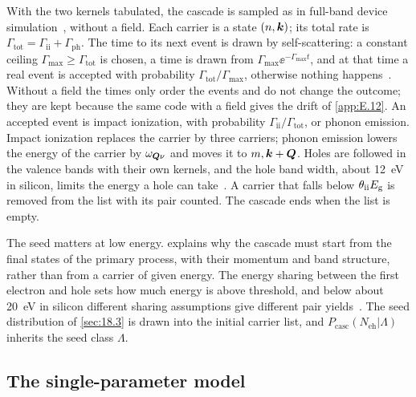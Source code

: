 With the two kernels tabulated, the cascade is sampled as in full-band device simulation~\cite{fischetti1988monte}, without a field. Each carrier is a state $(n, \bm{k})$; its total rate is $\varGamma_{\mathrm{tot}} = \varGamma_{\mathrm{ii}} + \varGamma_{\mathrm{ph}}$. The time to its next event is drawn by self-scattering: a constant ceiling $\varGamma_{\mathrm{max}} \ge \varGamma_{\mathrm{tot}}$ is chosen, a time is drawn from $\varGamma_{\mathrm{max}}\ee^{-\varGamma_{\mathrm{max}}t}$, and at that time a real event is accepted with probability $\varGamma_{\mathrm{tot}}/\varGamma_{\mathrm{max}}$, otherwise nothing happens~\cite{jacoboni1983monte}. Without a field the times only order the events and do not change the outcome; they are kept because the same code with a field gives the drift of \cref{app:E.12}. An accepted event is impact ionization, with probability $\varGamma_{\mathrm{ii}}/\varGamma_{\mathrm{tot}}$, or phonon emission. Impact ionization replaces the carrier by three carriers; phonon emission lowers the energy of the carrier by $\omega_{\bm{Q}\nu}$ and moves it to $m, \bm{k}+\bm{Q}$. Holes are followed in the valence bands with their own kernels, and the hole band width, about \SI{12}{eV} in silicon, limits the energy a hole can take~\cite[Sect.~II\,A]{ramanathan2020ionization}. A carrier that falls below $\theta_{\mathrm{ii}}E_{\mathrm{g}}$ is removed from the list with its pair counted. The cascade ends when the list is empty.

The seed matters at low energy.  explains why the cascade must start from the final states of the primary process, with their momentum and band structure, rather than from a carrier of given energy. The energy sharing between the first electron and hole sets how much energy is above threshold, and below about \SI{20}{eV} in silicon different sharing assumptions give different pair yields~\cite[Sect.~IV\,B]{ramanathan2020ionization}. The seed distribution of \cref{sec:18.3} is drawn into the initial carrier list, and $P_{\mathrm{casc}}(N_{\mathrm{eh}}|\Lambda)$ inherits the seed class $\Lambda$.

\subsection{The single-parameter model}

